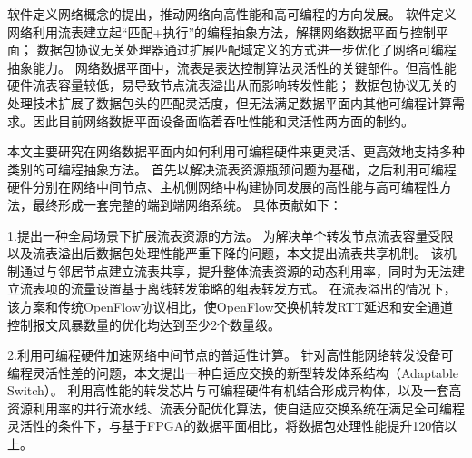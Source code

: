 
\setcounter{page}{1}

%
%
%

软件定义网络概念的提出，推动网络向高性能和高可编程的方向发展。
软件定义网络利用流表建立起“匹配+执行”的编程抽象方法，解耦网络数据平面与控制平面；
数据包协议无关处理器通过扩展匹配域定义的方式进一步优化了网络可编程抽象能力。
网络数据平面中，流表是表达控制算法灵活性的关键部件。但高性能硬件流表容量较低，易导致节点流表溢出从而影响转发性能；
数据包协议无关的处理技术扩展了数据包头的匹配灵活度，但无法满足数据平面内其他可编程计算需求。因此目前网络数据平面设备面临着吞吐性能和灵活性两方面的制约。

本文主要研究在网络数据平面内如何利用可编程硬件来更灵活、更高效地支持多种类别的可编程抽象方法。
首先以解决流表资源瓶颈问题为基础，之后利用可编程硬件分别在网络中间节点、主机侧网络中构建协同发展的高性能与高可编程性方法，最终形成一套完整的端到端网络系统。
具体贡献如下：


1.提出一种全局场景下扩展流表资源的方法。
为解决单个转发节点流表容量受限以及流表溢出后数据包处理性能严重下降的问题，本文提出流表共享机制。
该机制通过与邻居节点建立流表共享，提升整体流表资源的动态利用率，同时为无法建立流表项的流量设置基于离线转发策略的组表转发方式。
在流表溢出的情况下，该方案和传统OpenFlow协议相比，使OpenFlow交换机转发RTT延迟和安全通道控制报文风暴数量的优化均达到至少2个数量级。

2.利用可编程硬件加速网络中间节点的普适性计算。
针对高性能网络转发设备可编程灵活性差的问题，本文提出一种自适应交换的新型转发体系结构（Adaptable Switch）。
利用高性能的转发芯片与可编程硬件有机结合形成异构体，以及一套高资源利用率的并行流水线、流表分配优化算法，使自适应交换系统在满足全可编程灵活性的条件下，与基于FPGA的数据平面相比，将数据包处理性能提升120倍以上。

